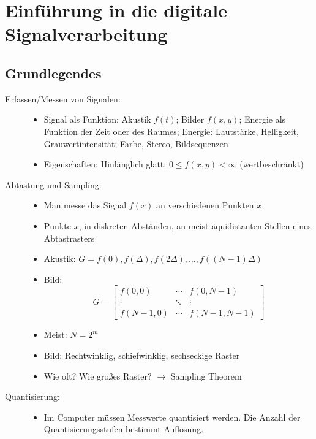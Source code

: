 
\section{Einführung in die digitale Signalverarbeitung}

\subsection{Grundlegendes}

\begin{description}
\item[Erfassen/Messen von Signalen:] \quad
\begin{itemize}
\item Signal als Funktion: Akustik $f(t)$; Bilder $f(x,y)$; Energie als Funktion der Zeit oder des Raumes; Energie: Lautstärke, Helligkeit, Grauwertintensität; Farbe, Stereo, Bildsequenzen
\item Eigenschaften: Hinlänglich glatt; $0 \leq f(x,y) < \infty$ (wertbeschränkt)
\end{itemize}
\item[Abtastung und Sampling:] \quad
\begin{itemize}
\item Man messe das Signal $f(x)$ an verschiedenen Punkten $x$
\item Punkte $x$, in diskreten Abständen, an meist äquidistanten Stellen eines Abtastrasters
\item Akustik: $G = f(0), f(\Delta), f(2 \Delta), \dots, f((N-1)\Delta)$
\item Bild: $$G = \left[ \begin{array}{ccc} f(0,0) & \cdots & f(0,N-1) \\ \vdots & \ddots & \vdots \\ f(N-1,0) & \cdots & f(N-1,N-1) \end{array} \right]$$
\item Meist: $N = 2^m$
\item Bild: Rechtwinklig, schiefwinklig, sechseckige Raster
\item Wie oft? Wie großes Raster? $\to$ Sampling Theorem
\end{itemize}
\item[Quantisierung:] \quad
\begin{itemize}
\item Im Computer müssen Messwerte quantisiert werden. Die Anzahl der Quantisierungsstufen bestimmt Auflösung.

\end{itemize}
\end{description}
